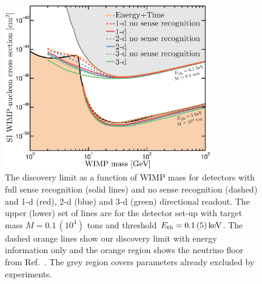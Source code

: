 \begin{figure}
\begin{center}
\includegraphics[width=0.8\textwidth,angle=0]{Figures/HeadTail_floors.eps}
\caption[Neutrino floor for directional detectors with no sense recognition]{The discovery limit as a function of WIMP mass for detectors with full sense recognition (solid lines) and no sense recognition (dashed) and 1-d (red), 2-d (blue) and 3-d (green) directional readout. The upper (lower) set of lines are for the detector set-up with target mass $M=0.1 \, (10^4)$ tons and threshold $E_{\rm th} = 0.1 \, (5) \, {\rm keV}$. The dashed orange lines show our discovery limit with energy information only and
the orange region shows the neutrino floor from Ref.~\cite{Ruppin:2014bra}. The grey region covers parameters already excluded by experiments.}
\label{fig:headtailfloors}
\end{center}
\end{figure} 

